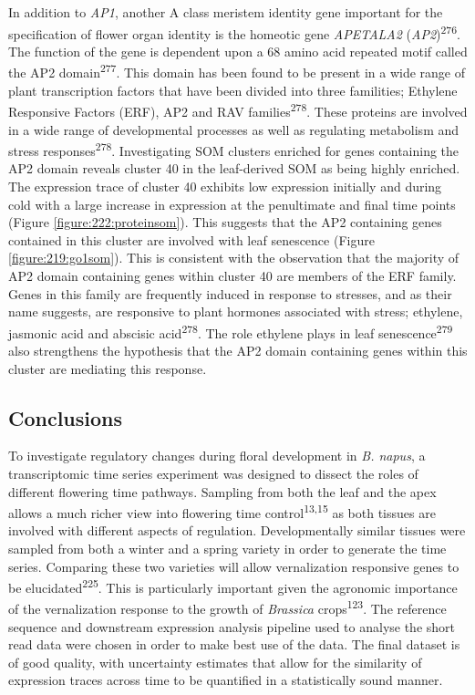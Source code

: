 \documentclass[12pt,]{book}
\begin{document}
In addition to \emph{AP1}, another A class meristem identity gene
important for the specification of flower organ identity is the homeotic
gene \emph{APETALA2} (\emph{AP2})\textsuperscript{276}. The function of
the gene is dependent upon a 68 amino acid repeated motif called the AP2
domain\textsuperscript{277}. This domain has been found to be present in
a wide range of plant transcription factors that have been divided into
three familities; Ethylene Responsive Factors (ERF), AP2 and RAV
families\textsuperscript{278}. These proteins are involved in a wide
range of developmental processes as well as regulating metabolism and
stress responses\textsuperscript{278}. Investigating SOM clusters
enriched for genes containing the AP2 domain reveals cluster 40 in the
leaf-derived SOM as being highly enriched. The expression trace of
cluster 40 exhibits low expression initially and during cold with a
large increase in expression at the penultimate and final time points
(Figure \ref{figure:222:proteinsom}). This suggests that the AP2
containing genes contained in this cluster are involved with leaf
senescence (Figure \ref{figure:219:go1som}). This is consistent with the
observation that the majority of AP2 domain containing genes within
cluster 40 are members of the ERF family. Genes in this family are
frequently induced in response to stresses, and as their name suggests,
are responsive to plant hormones associated with stress; ethylene,
jasmonic acid and abscisic acid\textsuperscript{278}. The role ethylene
plays in leaf senescence\textsuperscript{279} also strengthens the
hypothesis that the AP2 domain containing genes within this cluster are
mediating this response.

\subsection{Conclusions}\label{conclusions}

To investigate regulatory changes during floral development in \emph{B.
napus}, a transcriptomic time series experiment was designed to dissect
the roles of different flowering time pathways. Sampling from both the
leaf and the apex allows a much richer view into flowering time
control\textsuperscript{13,15} as both tissues are involved with
different aspects of regulation. Developmentally similar tissues were
sampled from both a winter and a spring variety in order to generate the
time series. Comparing these two varieties will allow vernalization
responsive genes to be elucidated\textsuperscript{225}. This is
particularly important given the agronomic importance of the
vernalization response to the growth of \emph{Brassica}
crops\textsuperscript{123}. The reference sequence and downstream
expression analysis pipeline used to analyse the short read data were
chosen in order to make best use of the data. The final dataset is of
good quality, with uncertainty estimates that allow for the similarity
of expression traces across time to be quantified in a statistically
sound manner.
\end{document}
